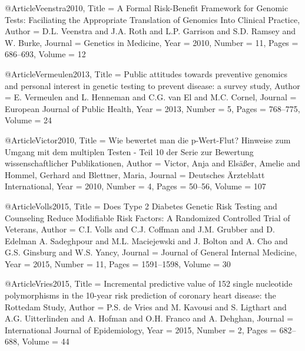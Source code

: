@Article{Veenstra2010,
  Title                    = {A Formal Risk-Benefit Framework for Genomic Tests: Faciliating the Appropriate Translation of Genomics Into Clinical Practice},
  Author                   = {D.L. Veenstra and J.A. Roth and L.P. Garrison and S.D. Ramsey and W. Burke},
  Journal                  = {Genetics in Medicine},
  Year                     = {2010},
  Number                   = {11},
  Pages                    = {686--693},
  Volume                   = {12}
}

@Article{Vermeulen2013,
  Title                    = {Public attitudes towards preventive genomics and personal interest in genetic testing to prevent disease: a survey study},
  Author                   = {E. Vermeulen and L. Henneman and C.G. van El and M.C. Cornel},
  Journal                  = {European Journal of Public Health},
  Year                     = {2013},
  Number                   = {5},
  Pages                    = {768--775},
  Volume                   = {24}
}

@Article{Victor2010,
  Title                    = {Wie bewertet man die p-Wert-Flut? Hinweise zum Umgang mit dem multiplen Testen - Teil 10 der Serie zur Bewertung wissenschaftlicher Publikationen},
  Author                   = {Victor, Anja and Elsäßer, Amelie and Hommel, Gerhard and Blettner, Maria},
  Journal                  = {Deutsches Ärzteblatt International},
  Year                     = {2010},
  Number                   = {4},
  Pages                    = {50--56},
  Volume                   = {107}
}

@Article{Volls2015,
  Title                    = {Does Type 2 Diabetes Genetic Risk Testing and Counseling Reduce Modifiable Risk Factors: A Randomized Controlled Trial of Veterans},
  Author                   = {C.I. Volls and C.J. Coffman and J.M. Grubber and D. Edelman A. Sadeghpour and M.L. Maciejewski and J. Bolton and A. Cho and G.S. Ginsburg and W.S. Yancy},
  Journal                  = {Journal of General Internal Medicine},
  Year                     = {2015},
  Number                   = {11},
  Pages                    = {1591--1598},
  Volume                   = {30}
}

@Article{Vries2015,
  Title                    = {Incremental predictive value of 152 single nucleotide polymorphisms in the 10-year risk prediction of coronary heart disease: the Rottedam Study},
  Author                   = {P.S. de Vries and M. Kavousi and S. Ligthart and A.G. Uitterlinden and A. Hofman and O.H. Franco and A. Dehghan},
  Journal                  = {International Journal of Epidemiology},
  Year                     = {2015},
  Number                   = {2},
  Pages                    = {682--688},
  Volume                   = {44}
}


